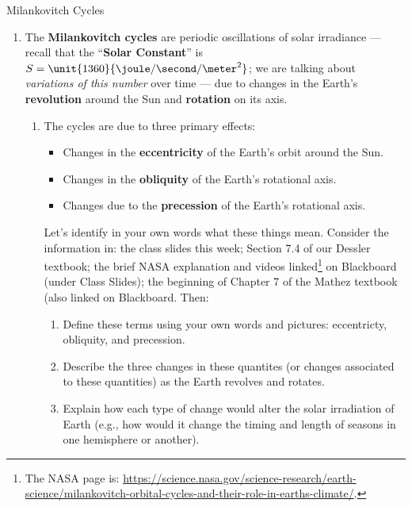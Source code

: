 \documentclass[12pt]{article}
\begin{document}
\begin{center}
{\Large Milankovitch Cycles}
\end{center}


%

\begin{enumerate}

\item  The {\bf Milankovitch cycles} are periodic oscillations of solar irradiance --- recall that the ``{\bf Solar Constant}'' is $S=\unit{1360}{\joule/\second/\meter^2}$; we are talking about {\em variations of this number} over time --- due to changes in the Earth's {\bf revolution} around the Sun and {\bf rotation} on its axis.
	\begin{enumerate}
	\item The cycles are due to three primary effects:
		\begin{itemize}
		\item Changes in the {\bf eccentricity} of the Earth's orbit around the Sun.
		\item Changes in the {\bf obliquity} of the Earth's rotational axis.
		\item Changes due to the {\bf precession} of the Earth's rotational axis.
		\end{itemize}
	Let's identify in your own words what these things mean.  Consider the information in: the class slides this week; Section 7.4 of our Dessler textbook; the brief NASA explanation and videos linked\footnote{The NASA page is: {\small \url{https://science.nasa.gov/science-research/earth-science/milankovitch-orbital-cycles-and-their-role-in-earths-climate/}}.} on Blackboard (under Class Slides); the beginning of Chapter 7 of the Mathez textbook (also linked on Blackboard.  Then:
		\begin{enumerate}[label=(\roman*)]
		\item Define these terms using your own words and pictures: eccentricty, obliquity, and precession. 
		\item Describe the three changes in these quantites (or changes associated to these quantities) as the Earth revolves and rotates. 
		\item Explain how each type of change would alter the solar irradiation of Earth (e.g., how would it change the timing and length of seasons in one hemisphere or another).

\end{enumerate}
\end{enumerate}
\end{enumerate}
\end{document}

